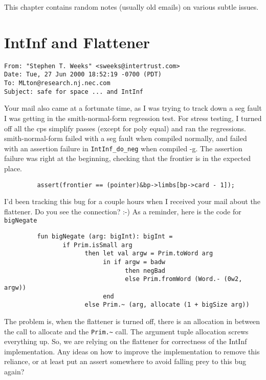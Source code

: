 
This chapter contains random notes (usually old emails) on various
subtle issues.

\section{IntInf and Flattener}

\begin{verbatim}
From: "Stephen T. Weeks" <sweeks@intertrust.com>
Date: Tue, 27 Jun 2000 18:52:19 -0700 (PDT)
To: MLton@research.nj.nec.com
Subject: safe for space ... and IntInf
\end{verbatim}

Your mail also came at a fortunate time, as I was trying to track down
a seg fault I was getting in the smith-normal-form regression test.
For stress testing, I turned off all the cps simplify passes (except
for poly equal) and ran the regressions.  smith-normal-form failed
with a seg fault when compiled normally, and failed with an assertion
failure in \verb+IntInf_do_neg+ when compiled -g.  The assertion
failure was right at the beginning, checking that the frontier is in
the expected place.
\begin{verbatim}
         assert(frontier == (pointer)&bp->limbs[bp->card - 1]);
\end{verbatim}
I'd been tracking this bug for a couple hours when I received your
mail about the flattener.  Do you see the connection? :-)  As a
reminder, here is the code for \verb+bigNegate+
\begin{verbatim}
         fun bigNegate (arg: bigInt): bigInt =
                if Prim.isSmall arg
                      then let val argw = Prim.toWord arg
                           in if argw = badw
                                 then negBad
                                 else Prim.fromWord (Word.- (0w2, argw))
                           end
                      else Prim.~ (arg, allocate (1 + bigSize arg))
\end{verbatim}
The problem is, when the flattener is turned off, there is an
allocation in between the call to allocate and the \verb+Prim.~+ call.  The
argument tuple allocation screws everything up.  So, we are relying on 
the flattener for correctness of the IntInf implementation.  Any ideas 
on how to improve the implementation to remove this reliance, or at
least put an assert somewhere to avoid falling prey to this bug again?

